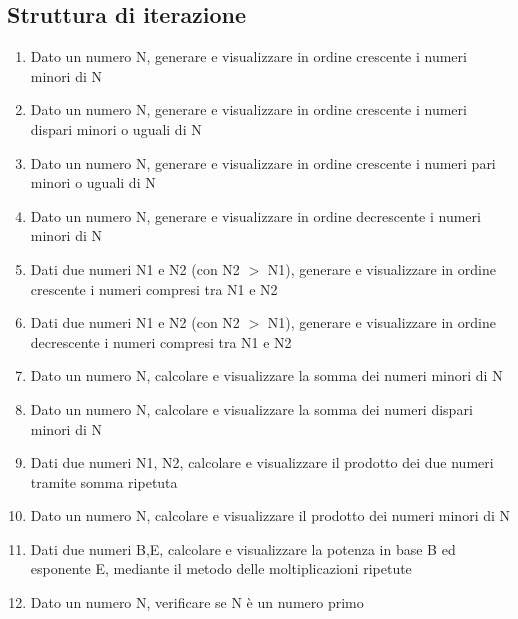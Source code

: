 \documentclass{article}
\begin{document}
	\subsection{Struttura di iterazione}
	\begin{enumerate}
		\item Dato un numero N, generare e visualizzare in ordine crescente i numeri minori di N
		\item Dato un numero N, generare e visualizzare in ordine crescente i numeri dispari minori o uguali di N
		\item Dato un numero N, generare e visualizzare in ordine crescente i numeri pari minori o uguali di N
		\item Dato un numero N, generare e visualizzare in ordine decrescente i numeri minori di N
		\item Dati due numeri N1 e N2 (con N2 $>$ N1), generare e visualizzare in ordine crescente i numeri compresi tra N1 e N2
		\item Dati due numeri N1 e N2 (con N2 $>$ N1), generare e visualizzare in ordine decrescente i numeri compresi tra N1 e N2
		\item Dato un numero N, calcolare e visualizzare la somma dei numeri minori di N
		\item Dato un numero N, calcolare e visualizzare la somma dei numeri dispari minori di N
		\item Dati due numeri N1, N2, calcolare e visualizzare il prodotto dei due numeri tramite somma ripetuta
		\item Dato un numero N, calcolare e visualizzare il prodotto dei numeri minori di N
		\item Dati due numeri B,E, calcolare e visualizzare la potenza in base B ed esponente E, mediante il metodo delle moltiplicazioni ripetute
		\item Dato un numero N, verificare se N è un numero primo
	\end{enumerate}
\end{document}
